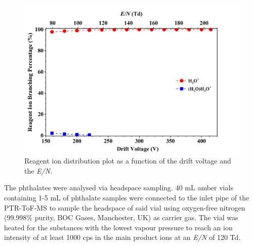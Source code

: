         \begin{figure}[htb]%
        \centering
        \includegraphics[height=0.4\textheight]{pics/PH/RI-BR.png}
        \caption{Reagent ion distribution plot as a function of the drift voltage and the \textit{E/N}.}
        \label{fig:PH_RI}
        \end{figure}




The phthalates were analysed via headspace sampling. 
%
40 mL amber vials containing 1-5 mL of  phthalate samples were connected to the inlet pipe of the PTR-ToF-MS to sample the headspace of said vial using oxygen-free nitrogen (99.998\% purity, BOC Gases, Manchester, UK) as carrier gas.
%
The vial was heated for the substances with the lowest vapour pressure  %
to reach an ion intensity of at least 1000 %
 cps in the main product ions  at an \textit{E/N} of 120 Td.
%



